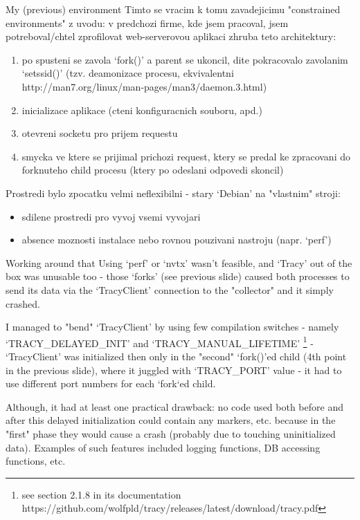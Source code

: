 \documentclass[aspectratio=169]{beamer}
\begin{document}
\begin{frame}{My (previous) environment}
    Timto se vracim k tomu zavadejicimu "constrained environments" z uvodu: v predchozi firme, kde jsem pracoval, jsem potreboval/chtel zprofilovat web-serverovou aplikaci zhruba teto architektury:

    \begin{enumerate}
        \item po spusteni se zavola `fork()' a parent se ukoncil, dite pokracovalo zavolanim `setssid()' (tzv. deamonizace procesu, ekvivalentni http://man7.org/linux/man-pages/man3/daemon.3.html)
        \item inicializace aplikace (cteni konfiguracnich souboru, apd.)
        \item otevreni socketu pro prijem requestu
        \item smycka ve ktere se prijimal prichozi request, ktery se predal ke zpracovani do forknuteho child procesu (ktery po odeslani odpovedi skoncil)
    \end{enumerate}

    Prostredi bylo zpocatku velmi neflexibilni - stary `Debian' na "vlastnim" stroji:
    
    \begin{itemize}
        \item sdilene prostredi pro vyvoj vsemi vyvojari
        \item absence moznosti instalace nebo rovnou pouzivani nastroju (napr. `perf')
    \end{itemize}

\end{frame}

\begin{frame}{Working around that}
    Using `perf' or `nvtx' wasn't feasible, and `Tracy' out of the box was unusable too - those `forks' (see previous slide) caused both processes to send its data via the `TracyClient' connection to the "collector" and it simply crashed.

    I managed to "bend" `TracyClient' by using few compilation switches - namely `TRACY\_DELAYED\_INIT' and `TRACY\_MANUAL\_LIFETIME' \footnote{see section 2.1.8 in its documentation https://github.com/wolfpld/tracy/releases/latest/download/tracy.pdf} - `TracyClient' was initialized then only in the "second" `fork()'ed child (4th point in the previous slide), where it juggled with `TRACY\_PORT' value - it had to use different port numbers for each `fork`ed child.

    Although, it had at least one practical drawback: no code used both before and after this delayed initialization could contain any markers, etc. because in the "first" phase they would cause a crash (probably due to touching uninitialized data). Examples of such features included logging functions, DB accessing functions, etc.

\end{frame}
\end{document}
